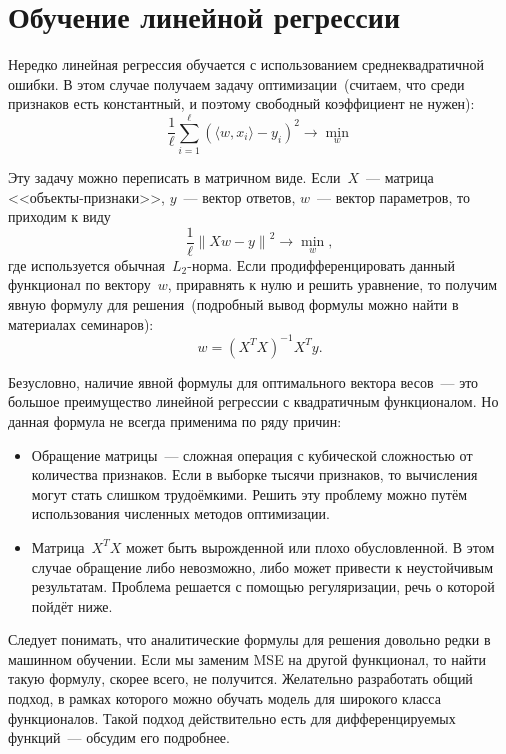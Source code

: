 \documentclass[12pt,fleqn]{article}
\begin{document}
\section{Обучение линейной регрессии}

Нередко линейная регрессия обучается с использованием среднеквадратичной ошибки.
В этом случае получаем задачу оптимизации~(считаем, что среди признаков есть константный, и поэтому
свободный коэффициент не нужен):
\[
    \frac{1}{\ell}
    \sum_{i = 1}^{\ell} \left(
        \langle w, x_i \rangle - y_i
    \right)^2
    \to
    \min_{w}
\]

Эту задачу можно переписать в матричном виде.
Если~$X$~--- матрица <<объекты-признаки>>, $y$~--- вектор ответов, $w$~--- вектор параметров,
то приходим к виду
\begin{equation}
\label{eq:lsq}
    \frac{1}{\ell}
    \left\|
        Xw - y
    \right\|^2
    \to
    \min_{w},
\end{equation}
где используется обычная~$L_2$-норма.
Если продифференцировать данный функционал по вектору~$w$, приравнять к нулю
и решить уравнение, то получим явную формулу для решения~(подробный вывод формулы можно
найти в материалах семинаров):
\[
    w
    =
    (X^T X)^{-1} X^T y.
\]

Безусловно, наличие явной формулы для оптимального вектора весов~--- это большое
преимущество линейной регрессии с квадратичным функционалом.
Но данная формула не всегда применима по ряду причин:
\begin{itemize}
    \item Обращение матрицы~--- сложная операция с кубической сложностью от количества признаков.
        Если в выборке тысячи признаков, то вычисления могут стать слишком трудоёмкими.
        Решить эту проблему можно путём использования численных методов оптимизации.
    \item Матрица~$X^T X$ может быть вырожденной или плохо обусловленной.
        В этом случае обращение либо невозможно, либо может привести к неустойчивым результатам.
        Проблема решается с помощью регуляризации, речь о которой пойдёт ниже.
\end{itemize}

Следует понимать, что аналитические формулы для решения довольно редки в машинном обучении.
Если мы заменим MSE на другой функционал, то найти такую формулу, скорее всего, не получится.
Желательно разработать общий подход, в рамках которого можно обучать модель для широкого
класса функционалов.
Такой подход действительно есть для дифференцируемых функций~--- обсудим его подробнее.
\end{document}
